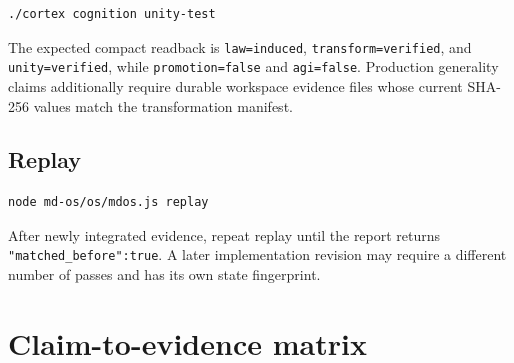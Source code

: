 \documentclass[10pt,twocolumn]{article}
\theoremstyle{definition}
\theoremstyle{plain}
\theoremstyle{remark}
\newcommand{\file}[1]{\nolinkurl{#1}}
\begin{document}
\begin{lstlisting}
./cortex cognition unity-test
\end{lstlisting}

The expected compact readback is \file{law=induced}, \file{transform=verified}, and \file{unity=verified}, while \file{promotion=false} and \file{agi=false}.  Production generality claims additionally require durable workspace evidence files whose current SHA-256 values match the transformation manifest.

\subsection{Replay}

\begin{lstlisting}
node md-os/os/mdos.js replay
\end{lstlisting}

After newly integrated evidence, repeat replay until the report returns \file{"matched_before":true}.  A later implementation revision may require a different number of passes and has its own state fingerprint.

\section{Claim-to-evidence matrix}
\label{app:evidence}
\end{document}
